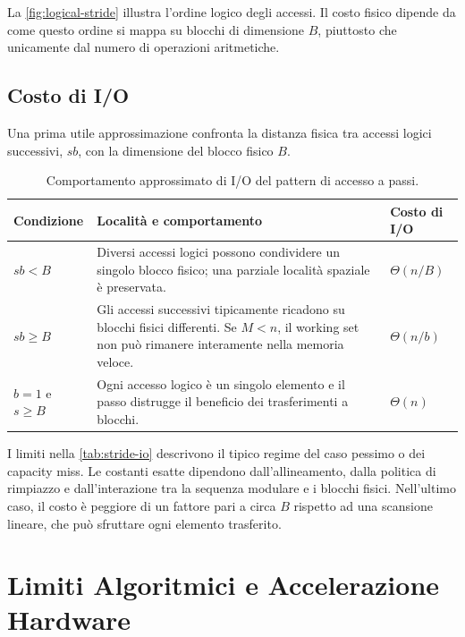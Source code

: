 La \autoref{fig:logical-stride} illustra l'ordine logico degli accessi. Il costo fisico dipende da come questo ordine si mappa su blocchi di dimensione $B$, piuttosto che unicamente dal numero di operazioni aritmetiche.

\FloatBarrier
\subsection{Costo di I/O}
\label{subsec:stride-io}

Una prima utile approssimazione confronta la distanza fisica tra accessi logici successivi, $s b$, con la dimensione del blocco fisico $B$.

\begin{table}[H]
  \centering
  \caption{Comportamento approssimato di I/O del pattern di accesso a passi.}
  \label{tab:stride-io}
  \begin{tabularx}{\textwidth}{@{}p{}YY@{}}
    \toprule
    Condizione & Località e comportamento & Costo di I/O \\
    \midrule
    $s b < B$ & Diversi accessi logici possono condividere un singolo blocco fisico; una parziale località spaziale è preservata. & $\Theta(n/B)$ \\
    $s b \geq B$ & Gli accessi successivi tipicamente ricadono su blocchi fisici differenti. Se $M<n$, il working set non può rimanere interamente nella memoria veloce. &
      $\Theta(n/b)$ \\
    $b=1$ e $s\geq B$ & Ogni accesso logico è un singolo elemento e il passo distrugge il beneficio dei trasferimenti a blocchi. & $\Theta(n)$ \\
    \bottomrule
  \end{tabularx}
\end{table}

I limiti nella \autoref{tab:stride-io} descrivono il tipico regime del caso pessimo o dei capacity miss. Le costanti esatte dipendono dall'allineamento, dalla politica di rimpiazzo e dall'interazione tra la sequenza modulare e i blocchi fisici. Nell'ultimo caso, il costo è peggiore di un fattore pari a circa $B$ rispetto ad una scansione lineare, che può sfruttare ogni elemento trasferito.

\FloatBarrier
\section{Limiti Algoritmici e Accelerazione Hardware}
\label{sec:scaling-laws}

